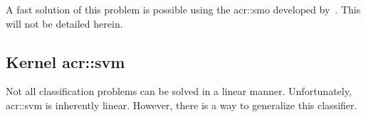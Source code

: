         A fast solution of this problem is possible using the \gls{acr::smo} developed by~\textcite{platt1998sequential}.
        This will not be detailed herein. 

    \subsection{Kernel \acrshort*{acr::svm}}
        Not all classification problems can be solved in a linear manner.
        Unfortunately, \gls{acr::svm} is inherently linear.
        However, there is a way to generalize this classifier.\\

        \begin{figure}
            \centering
        \end{figure}

